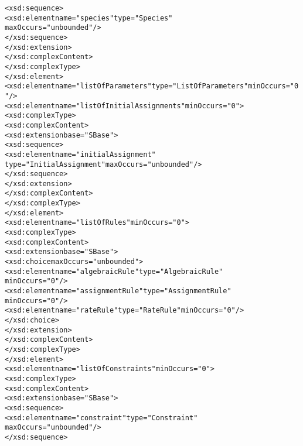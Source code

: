 \begin{alltt}
                                    <xsd:sequence>
                                        <xsd:element name="species" type="Species"
                                            maxOccurs="unbounded"/>
                                    </xsd:sequence>
                                </xsd:extension>
                            </xsd:complexContent>
                        </xsd:complexType>
                    </xsd:element>
                    <xsd:element name="listOfParameters" type="ListOfParameters" minOccurs="0"/>
                    <xsd:element name="listOfInitialAssignments" minOccurs="0">
                        <xsd:complexType>
                            <xsd:complexContent>
                                <xsd:extension base="SBase">
                                    <xsd:sequence>
                                        <xsd:element name="initialAssignment"
                                            type="InitialAssignment" maxOccurs="unbounded"/>
                                    </xsd:sequence>
                                </xsd:extension>
                            </xsd:complexContent>
                        </xsd:complexType>
                    </xsd:element>
                    <xsd:element name="listOfRules" minOccurs="0">
                        <xsd:complexType>
                            <xsd:complexContent>
                                <xsd:extension base="SBase">
                                    <xsd:choice maxOccurs="unbounded">
                                        <xsd:element name="algebraicRule" type="AlgebraicRule"
                                            minOccurs="0"/>
                                        <xsd:element name="assignmentRule" type="AssignmentRule"
                                            minOccurs="0"/>
                                        <xsd:element name="rateRule" type="RateRule" minOccurs="0"/>
                                    </xsd:choice>
                                </xsd:extension>
                            </xsd:complexContent>
                        </xsd:complexType>
                    </xsd:element>
                    <xsd:element name="listOfConstraints" minOccurs="0">
                        <xsd:complexType>
                            <xsd:complexContent>
                                <xsd:extension base="SBase">
                                    <xsd:sequence>
                                        <xsd:element name="constraint" type="Constraint"
                                            maxOccurs="unbounded"/>
                                    </xsd:sequence>

\end{alltt}
